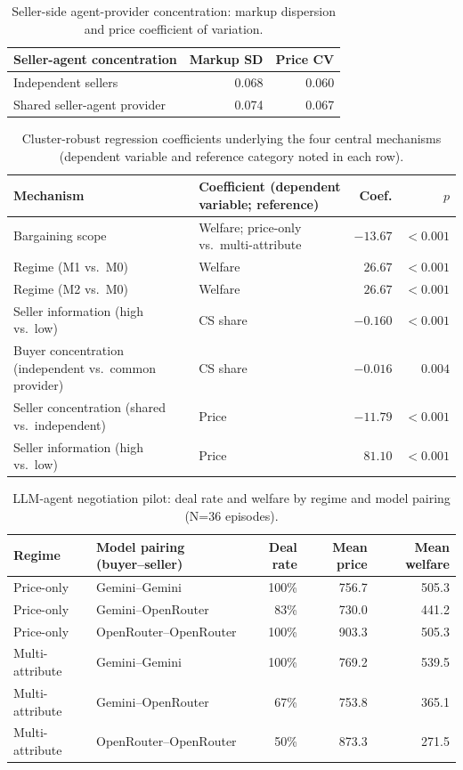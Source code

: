 \documentclass[review]{elsarticle}
\begin{document}
\begin{table}[htbp]
\centering
\caption{Seller-side agent-provider concentration: markup dispersion and price coefficient of variation.}
\label{tab:sellerconcentration}
\begin{tabular}{lrr}
\toprule
Seller-agent concentration & Markup SD & Price CV \\
\midrule
Independent sellers & 0.068 & 0.060 \\
Shared seller-agent provider & 0.074 & 0.067 \\
\bottomrule
\end{tabular}
\end{table}

\begin{table}[htbp]
\centering
\caption{Cluster-robust regression coefficients underlying the four central mechanisms (dependent variable and reference category noted in each row).}
\label{tab:regressions}
\small
\begin{tabular}{p{4.2cm}p{4.2cm}rr}
\toprule
Mechanism & Coefficient (dependent variable; reference) & Coef. & $p$ \\
\midrule
Bargaining scope & Welfare; price-only vs.\ multi-attribute & $-13.67$ & $<0.001$ \\
Regime (M1 vs.\ M0) & Welfare & $26.67$ & $<0.001$ \\
Regime (M2 vs.\ M0) & Welfare & $26.67$ & $<0.001$ \\
Seller information (high vs.\ low) & CS share & $-0.160$ & $<0.001$ \\
Buyer concentration (independent vs.\ common provider) & CS share & $-0.016$ & $0.004$ \\
Seller concentration (shared vs.\ independent) & Price & $-11.79$ & $<0.001$ \\
Seller information (high vs.\ low) & Price & $81.10$ & $<0.001$ \\
\bottomrule
\end{tabular}
\end{table}

\begin{table}[htbp]
\centering
\caption{LLM-agent negotiation pilot: deal rate and welfare by regime and model pairing (N=36 episodes).}
\label{tab:llm_pilot}
\small
\begin{tabular}{llrrr}
\toprule
Regime & Model pairing (buyer--seller) & Deal rate & Mean price & Mean welfare \\
\midrule
Price-only & Gemini--Gemini & 100\% & 756.7 & 505.3 \\
Price-only & Gemini--OpenRouter & 83\% & 730.0 & 441.2 \\
Price-only & OpenRouter--OpenRouter & 100\% & 903.3 & 505.3 \\
Multi-attribute & Gemini--Gemini & 100\% & 769.2 & 539.5 \\
Multi-attribute & Gemini--OpenRouter & 67\% & 753.8 & 365.1 \\
Multi-attribute & OpenRouter--OpenRouter & 50\% & 873.3 & 271.5 \\
\bottomrule
\end{tabular}
\end{table}
\end{document}
